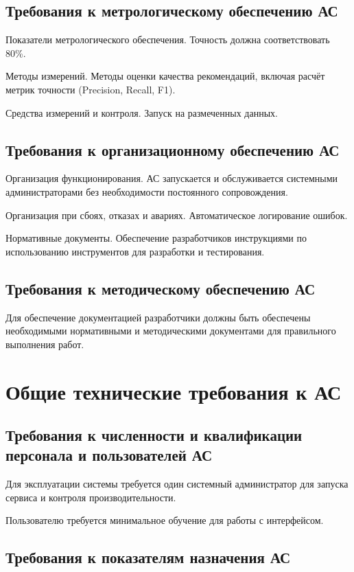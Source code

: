 \subsection{Требования к метрологическому обеспечению АС}

Показатели метрологического обеспечения.
Точность  должна соответствовать 80\%.

Методы измерений.
Методы оценки качества рекомендаций, включая расчёт метрик точности (Precision, Recall, F1).

Средства измерений и контроля.
Запуск на размеченных данных.

\subsection{Требования к организационному обеспечению АС}

Организация функционирования.
АС запускается и обслуживается системными администраторами
без необходимости постоянного сопровождения.

Организация при сбоях, отказах и авариях.
Автоматическое логирование ошибок.

Нормативные документы.
Обеспечение разработчиков инструкциями по использованию инструментов
для разработки и тестирования.

\subsection{Требования к методическому обеспечению АС}

Для обеспечение документацией разработчики
должны быть обеспечены необходимыми нормативными
и методическими документами для правильного выполнения работ.

\section{Общие технические требования к АС}

\subsection{Требования к численности
	и квалификации персонала и пользователей АС}

Для эксплуатации системы требуется один системный администратор
для запуска сервиса и контроля производительности.

Пользователю требуется минимальное обучение для работы с интерфейсом.

\subsection{Требования к показателям назначения АС}

